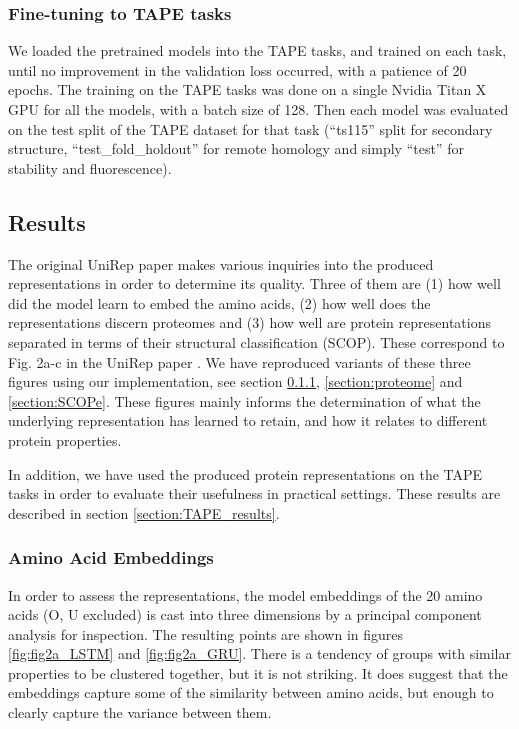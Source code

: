 \documentclass[a4paper,12pt]{article}
\begin{document}
\subsubsection{Fine-tuning to TAPE tasks}
We loaded the pretrained models into the TAPE tasks, and trained on each task, until no improvement in the validation loss occurred, with a patience of 20 epochs. The training on the TAPE tasks was done on a single Nvidia Titan X GPU for all the models, with a batch size of 128. Then each model was evaluated on the test split of the TAPE dataset for that task (``ts115'' split for secondary structure, ``test\_fold\_holdout'' for remote homology and simply ``test'' for stability and fluorescence).

\subsection{Results}
\label{section:reproduction_results}
The original UniRep paper makes various inquiries into the produced representations in order to determine its quality. Three of them are (1) how well did the model learn to embed the amino acids, (2) how well does the representations discern proteomes and (3) how well are protein representations separated in terms of their structural classification (SCOP). These correspond to Fig. 2a-c in the UniRep paper \cite{alley2019unified}. We have reproduced variants of these three figures using our implementation, see section \ref{section:amino}, \ref{section:proteome} and \ref{section:SCOPe}. These figures mainly informs the determination of what the underlying representation has learned to retain, and how it relates to different protein properties.

In addition, we have used the produced protein representations on the TAPE tasks in order to evaluate their usefulness in practical settings. These results are described in section \ref{section:TAPE_results}.

\subsubsection{Amino Acid Embeddings}
\label{section:amino}
In order to assess the representations, the model embeddings of the 20 amino acids (O, U excluded) is cast into three dimensions by a principal component analysis for inspection. The resulting points are shown in figures \ref{fig:fig2a_LSTM} and \ref{fig:fig2a_GRU}. There is a tendency of groups with similar properties to be clustered together, but it is not striking. It does suggest that the embeddings capture some of the similarity between amino acids, but enough to clearly capture the variance between them.
\end{document}
